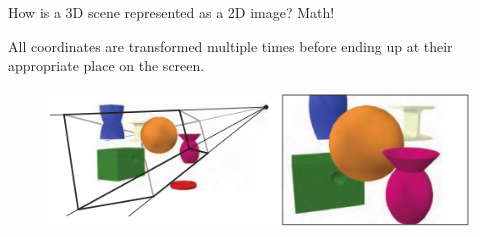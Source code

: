 \documentclass[10pt]{beamer}
\begin{document}
{ %
\begin{frame}{How is a 3D scene represented as a 2D image?}
  Math!

  All coordinates are transformed multiple times before ending up at their appropriate place on the screen.

  \begin{figure}
    \includegraphics[width=\textwidth]{rtr_fig2_1.png}
  \end{figure}

\end{frame}}
\end{document}
